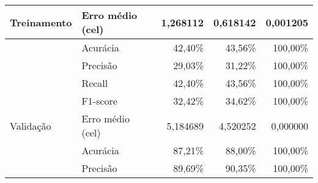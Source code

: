 \begin{table}[ht!]
{\begin{tabular}{l|l|rrr}
            \multirow{-5}{*}{Treinamento}                   & Erro médio (\acrshort{cel})                         & \multicolumn{1}{r|}{1,268112}                                                & \multicolumn{1}{r|}{0,618142}                                               & 0,001205                         \\ \hline
                                                            & Acurácia                                            & \multicolumn{1}{r|}{42,40\%}                                                 & \multicolumn{1}{r|}{43,56\%}                                                & 100,00\%                         \\
                                                            & Precisão                                            & \multicolumn{1}{r|}{29,03\%}                                                 & \multicolumn{1}{r|}{31,22\%}                                                & 100,00\%                         \\
                                                            & Recall                                              & \multicolumn{1}{r|}{42,40\%}                                                 & \multicolumn{1}{r|}{43,56\%}                                                & 100,00\%                         \\
                                                            & F1-score                                            & \multicolumn{1}{r|}{32,42\%}                                                 & \multicolumn{1}{r|}{34,62\%}                                                & 100,00\%                         \\
            \multirow{-5}{*}{Validação}                     & Erro médio (\acrshort{cel})                         & \multicolumn{1}{r|}{5,184689}                                                & \multicolumn{1}{r|}{4,520252}                                               & 0,000000                         \\ \hline
                                                            & \cellcolor[HTML]{FFF5E1}Acurácia                    & \multicolumn{1}{r|}{\cellcolor[HTML]{FFF5E1}87,21\%}                         & \multicolumn{1}{r|}{\cellcolor[HTML]{FFF5E1}88,00\%}                        & \cellcolor[HTML]{FFF5E1}100,00\% \\
                                                            & Precisão                                            & \multicolumn{1}{r|}{89,69\%}                                                 & \multicolumn{1}{r|}{90,35\%}                                                & 100,00\%                         \\

\end{tabular}}
\end{table}
